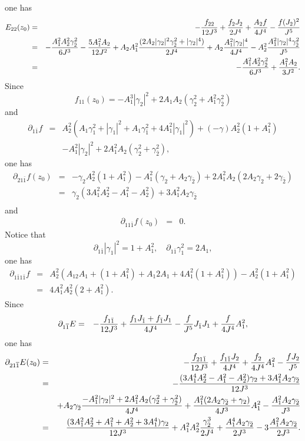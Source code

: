 \documentclass[12pt]{amsart}
\def\1bar{\overline{1}}
\def\d{\partial}
\def\d{\partial}
\begin{document}
one has
\begin{eqnarray*}
E_{2 2}(z_0)&=&-{f_{22}\over 12 J^3}+{f_2 J_2\over 2 J^4}+{A_2f \over 4J^4}-{f(J_2)^2\over J^5}\\
&=&-{A_1^2 A_2^2 \gamma_{\bar2}^2 \over 6 J^3}-{5 A_1^2A_2 \over 12 J^2}+A_2 A_1^2 {(2 A_2 |\gamma_2|^2 \gamma_{\bar2}^2+|\gamma_2|^4)\over 2J^4}
+A_2{A_1^2|\gamma_2|^4 \over 4J^4}-A_2^2 {A_1^2 |\gamma_2 |^4 \gamma_{\bar 2}^2 \over J^5}\\
&=&-{A_1^2 A_2^2 \gamma_{\bar2}^2 \over 6 J^3}+{A_1^2A_2 \over 3 J^2}.
\end{eqnarray*}
Since
$$
f_{11}(z_0)=-A_1^3 |\gamma_2|^2+2A_1A_2 (\gamma_2^2+A_1^2 \gamma_{\bar2}^2)
$$
and
\begin{eqnarray*}
\d_{1\bar1}  f
&=&A_2^2 ( A_1 \gamma_1^2 + |\gamma_1|^2 +A_1 \gamma_{\bar1}^2 +4A_1^2|\gamma_1|^2 )
+(-\gamma) A_2^2 (1+A_1^2)\\
&&-A_1^2|\gamma_2|^2+2A_1^2A_2 ( \gamma_2^2 + \gamma_{\bar2}^2 ),
\end{eqnarray*}
one has
\begin{eqnarray*}
\d_{2 1\bar1}  f(z_0)
&=&-\gamma_2 A_2^2 (1+A_1^2)-A_1^2 (\gamma_2+A_2 \gamma_{\bar2} )+2A_1^2A_2 (2 A_2 \gamma_2+2 \gamma_{\bar2})\\
&=&\gamma_2 (3A_1^2A_2^2 -A_1^2-A_2^2) +3A_1^2A_2  \gamma_{\bar2}\\
\end{eqnarray*}
and
\begin{eqnarray*}
\d_{11\bar1}  f (z_0)
&=&0.
\end{eqnarray*}
Notice that
$$
\d_{1\bar1} |\gamma_1|^2=1+A_1^2,\quad \d_{1\bar1} \gamma_1^2=2A_1,
$$
one has
\begin{eqnarray*}
\d_{1\bar1 1\bar1}  f
&=&A_2^2 ( A_12 A_1+ (1+A_1^2) +A_1 2A_1 +4A_1^2(1+A_1^2) )
-A_2^2 (1+A_1^2)\\
&=&4A_1^2A_2^2(2+A_1^2).
\end{eqnarray*}
Since
\begin{eqnarray*}
\d_{  1 \1bar } E&=&-{f_{1\bar1} \over 12 J^3}+{f _1 J_{\bar 1}  +f_{\bar 1} J_1\over 4 J^4} -{f \over J^5} J_{\bar 1} J_1+{f\over 4 J^4} A_1^2,
\end{eqnarray*} 
one has
\begin{eqnarray*}
\d_{2 1 \1bar } E(z_0)&=&-{f_{21\bar1} \over 12 J^3}+{f_{1\bar1} J_2 \over 4 J^4} +{f_2\over 4 J^4} A_1^2-{fJ_2 \over J^5}\\
&=&-{(3A_1^4A_2^2-A_1^2-A_2^2)\gamma_2+3A_1^2 A_2 \gamma_{\bar2} \over 12 J^3}\\
&&+A_2 \gamma_{\bar2} {-A_1^2|\gamma_2|^2+2A_1^2A_2(\gamma_2^2+\gamma_{\bar2}^2)  \over 4 J^4} +{A_1^2 (2A_2 \gamma_{\bar2}+\gamma_2) \over 4 J^3} A_1^2-{A_1^2 A_2 \gamma_{\bar2}  \over J^3}\\
&=&{(3A_1^2A_2^2+A_1^2+A_2^2+3A_1^4)\gamma_2 \over 12 J^3} + A_1^2A_2^2{ \gamma_{\bar2}^3  \over 2 J^4} +{ A_1^4 A_2 \gamma_{\bar2} \over 2 J^3} 
-3 {A_1^2 A_2 \gamma_{\bar2}  \over 2 J^3}.
\end{eqnarray*} 
\end{document}
